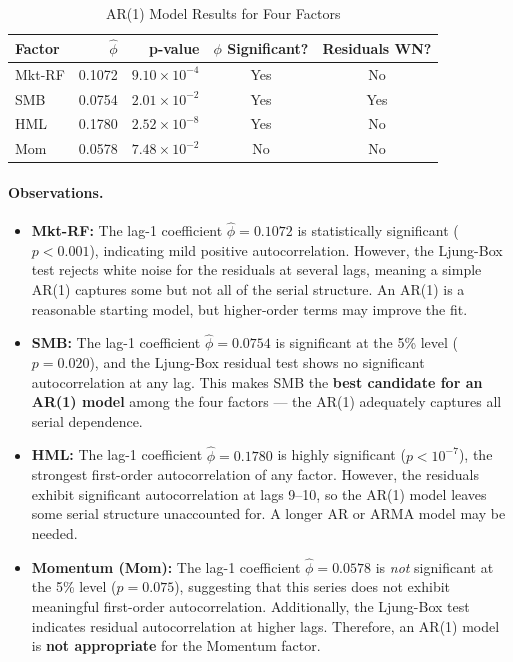 \documentclass[12pt]{article}
\begin{document}
	\begin{table}[H]
		\centering
		\caption{AR(1) Model Results for Four Factors}
		\label{tab:ar1}
		\begin{tabular}{l r r c c}
			\toprule
			\textbf{Factor} & $\hat{\phi}$ & \textbf{p-value} & $\phi$ \textbf{Significant?} & \textbf{Residuals WN?} \\
			\midrule
			Mkt-RF & 0.1072 & $9.10 \times 10^{-4}$ & Yes & No \\
			SMB    & 0.0754 & $2.01 \times 10^{-2}$ & Yes & Yes \\
			HML    & 0.1780 & $2.52 \times 10^{-8}$ & Yes & No \\
			Mom    & 0.0578 & $7.48 \times 10^{-2}$ & No  & No \\
			\bottomrule
		\end{tabular}
	\end{table}
	
	\newpage
	\paragraph{Observations.}
	\begin{itemize}
		\item \textbf{Mkt-RF:} The lag-1 coefficient $\hat\phi = 0.1072$ is statistically significant ($p < 0.001$), indicating mild positive autocorrelation. However, the Ljung-Box test rejects white noise for the residuals at several lags, meaning a simple AR(1) captures some but not all of the serial structure. An AR(1) is a reasonable starting model, but higher-order terms may improve the fit.
		
		\item \textbf{SMB:} The lag-1 coefficient $\hat\phi = 0.0754$ is significant at the 5\% level ($p = 0.020$), and the Ljung-Box residual test shows no significant autocorrelation at any lag. This makes SMB the \textbf{best candidate for an AR(1) model} among the four factors --- the AR(1) adequately captures all serial dependence.
		
		\item \textbf{HML:} The lag-1 coefficient $\hat\phi = 0.1780$ is highly significant ($p < 10^{-7}$), the strongest first-order autocorrelation of any factor. However, the residuals exhibit significant autocorrelation at lags 9--10, so the AR(1) model leaves some serial structure unaccounted for. A longer AR or ARMA model may be needed.
		
		\item \textbf{Momentum (Mom):} The lag-1 coefficient $\hat\phi = 0.0578$ is \emph{not} significant at the 5\% level ($p = 0.075$), suggesting that this series does not exhibit meaningful first-order autocorrelation. Additionally, the Ljung-Box test indicates residual autocorrelation at higher lags. Therefore, an AR(1) model is \textbf{not appropriate} for the Momentum factor.
	\end{itemize}
	
\end{document}
